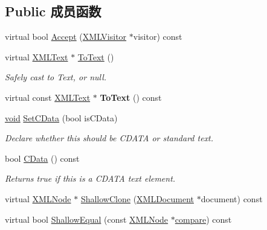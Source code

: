 \subsection*{Public 成员函数}
\begin{DoxyCompactItemize}
\item 
virtual bool \hyperlink{classtinyxml2_1_1_x_m_l_text_a537c60d7e18fb59c45ac2737a29ac47a}{Accept} (\hyperlink{classtinyxml2_1_1_x_m_l_visitor}{X\+M\+L\+Visitor} $\ast$visitor) const
\item 
\mbox{\label{classtinyxml2_1_1_x_m_l_text_ab1213b4ddebe9b17ec7e7040e9f1caf7}} 
virtual \hyperlink{classtinyxml2_1_1_x_m_l_text}{X\+M\+L\+Text} $\ast$ \hyperlink{classtinyxml2_1_1_x_m_l_text_ab1213b4ddebe9b17ec7e7040e9f1caf7}{To\+Text} ()
\begin{DoxyCompactList}\small\item\em Safely cast to Text, or null. \end{DoxyCompactList}\item 
\mbox{\label{classtinyxml2_1_1_x_m_l_text_a671ce22c7c5ef378f1ce31e6f827b9e2}} 
virtual const \hyperlink{classtinyxml2_1_1_x_m_l_text}{X\+M\+L\+Text} $\ast$ {\bfseries To\+Text} () const
\item 
\mbox{\label{classtinyxml2_1_1_x_m_l_text_ad080357d76ab7cc59d7651249949329d}} 
\hyperlink{interfacevoid}{void} \hyperlink{classtinyxml2_1_1_x_m_l_text_ad080357d76ab7cc59d7651249949329d}{Set\+C\+Data} (bool is\+C\+Data)
\begin{DoxyCompactList}\small\item\em Declare whether this should be C\+D\+A\+TA or standard text. \end{DoxyCompactList}\item 
\mbox{\label{classtinyxml2_1_1_x_m_l_text_ac1bb5ea4166c320882d9e0ad16fd385b}} 
bool \hyperlink{classtinyxml2_1_1_x_m_l_text_ac1bb5ea4166c320882d9e0ad16fd385b}{C\+Data} () const
\begin{DoxyCompactList}\small\item\em Returns true if this is a C\+D\+A\+TA text element. \end{DoxyCompactList}\item 
virtual \hyperlink{classtinyxml2_1_1_x_m_l_node}{X\+M\+L\+Node} $\ast$ \hyperlink{classtinyxml2_1_1_x_m_l_text_a86d265c93152726c8c6831e9594840e6}{Shallow\+Clone} (\hyperlink{classtinyxml2_1_1_x_m_l_document}{X\+M\+L\+Document} $\ast$document) const
\item 
virtual bool \hyperlink{classtinyxml2_1_1_x_m_l_text_a99d8bce4dc01df889126e047f358cdfc}{Shallow\+Equal} (const \hyperlink{classtinyxml2_1_1_x_m_l_node}{X\+M\+L\+Node} $\ast$\hyperlink{structcompare}{compare}) const
\end{DoxyCompactItemize}
